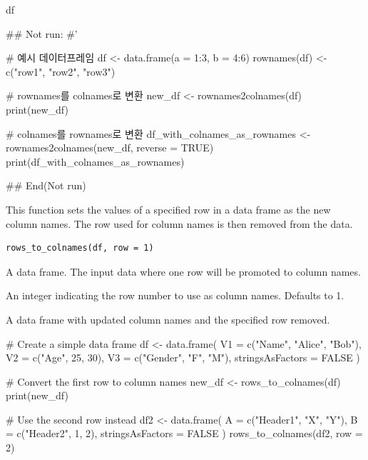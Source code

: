 \documentclass[a4paper]{book}
\begin{document}
%
\begin{Value}
df
\end{Value}
%
\begin{Examples}
\begin{ExampleCode}
\#\# Not run: 
#'

# 예시 데이터프레임
df <- data.frame(a = 1:3, b = 4:6)
rownames(df) <- c("row1", "row2", "row3")

# rownames를 colnames로 변환
new_df <- rownames2colnames(df)
print(new_df)

# colnames를 rownames로 변환
df_with_colnames_as_rownames <- rownames2colnames(new_df, reverse = TRUE)
print(df_with_colnames_as_rownames)

## End(Not run)
\end{ExampleCode}
\end{Examples}
%
\begin{Description}
This function sets the values of a specified row in a data frame as the new column names.
The row used for column names is then removed from the data.
\end{Description}
%
\begin{Usage}
\begin{verbatim}
rows_to_colnames(df, row = 1)
\end{verbatim}
\end{Usage}
%
\begin{Arguments}
\begin{ldescription}
\item[\code{df}] A data frame. The input data where one row will be promoted to column names.

\item[\code{row}] An integer indicating the row number to use as column names. Defaults to 1.
\end{ldescription}
\end{Arguments}
%
\begin{Value}
A data frame with updated column names and the specified row removed.
\end{Value}
%
\begin{Examples}
\begin{ExampleCode}
# Create a simple data frame
df <- data.frame(
  V1 = c("Name", "Alice", "Bob"),
  V2 = c("Age", 25, 30),
  V3 = c("Gender", "F", "M"),
  stringsAsFactors = FALSE
)

# Convert the first row to column names
new_df <- rows_to_colnames(df)
print(new_df)

# Use the second row instead
df2 <- data.frame(
  A = c("Header1", "X", "Y"),
  B = c("Header2", 1, 2),
  stringsAsFactors = FALSE
)
rows_to_colnames(df2, row = 2)
\end{ExampleCode}
\end{Examples}
\end{document}
